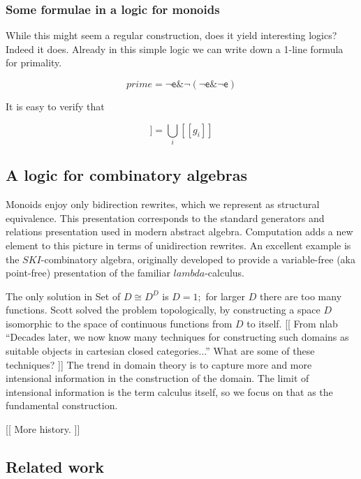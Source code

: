 \documentclass[]{acm_proc_article-sp}
\newcommand{\ldb}{[\![}
\newcommand{\rdb}{]\!]}
\newcommand{\meaningof}[1]{\ldb #1 \rdb}
\numberwithin{equation}{subsection}
\begin{document}
\subsubsection{Some formulae in a logic for monoids}

While this might seem a regular construction, does it yield
interesting logics? Indeed it does. Already in this simple logic we
can write down a 1-line formula for primality.

\begin{equation*}
  prime = \mathsf{\neg}\mathsf{e} \mathsf{\&} \mathsf{\neg}(\mathsf{\neg}\mathsf{e} \mathsf{\&} \mathsf{\neg}\mathsf{e})
\end{equation*}

It is easy to verify that 

\begin{equation*}
  \meaningof{prime} = \bigcup_i \meaningof{g_i}
\end{equation*}

\subsection{A logic for combinatory algebras}

Monoids enjoy only bidirection rewrites, which we represent as
structural equivalence. This presentation corresponds to the standard
generators and relations presentation used in modern abstract
algebra. Computation adds a new element to this picture in terms of
unidirection rewrites. An excellent example is the $SKI$-combinatory
algebra, originally developed to provide a variable-free (aka
point-free) presentation of the familiar $lambda$-calculus.

The only solution in Set of $D \cong D^D$ is $D=1;$ for larger $D$
there are too many functions.  Scott solved the problem topologically,
by constructing a space $D$ isomorphic to the space of continuous
functions from $D$ to itself. [[ From nlab ``Decades later, we now
know many techniques for constructing such domains as suitable objects
in cartesian closed categories...''  What are some of these
techniques? ]]  The trend in domain theory is to capture more and more
intensional information in the construction of the domain.  The limit
of intensional information is the term calculus itself, so we focus on
that as the fundamental construction.

[[ More history. ]]

\subsection{Related work}
\end{document}
